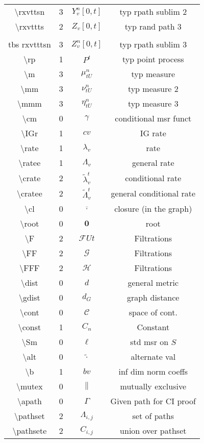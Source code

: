 \documentclass[12pt]{article}
\newcommand{\mc}{\mathcal}
\newcommand{\ov}{\overline}
\newcommand{\tbs}{\textbackslash}
\renewcommand{\root}{\mathbf{0}}				%
\renewcommand{\v}{v}							%
\renewcommand{\U}{U}							%
\renewcommand{\S}{S}							%
\renewcommand{\b}{b}							%
\renewcommand{\t}{t}							%
\newcommand{\F}{\mc{F}}							%
\newcommand{\FG}[2]{\mc{G}}						%
\newcommand{\FH}[2]{\mc{H}}						%
\newcommand{\IGr}{c}							%
\newcommand{\cl}{\ov}							%
\newcommand{\itt}{i}								%
\newcommand{\ittt}{j}								%
\newcommand{\numb}{n}								%
\newcommand{\rxvttsn}[3]{Y_{#1}^{#3}{#2}}			%
\newcommand{\rxvttts}[2]{Z_{#1}{#2}}				%
\newcommand{\rxvtttsn}[3]{Z_{#1}^{#3}{#2}}			%
\newcommand{\rp}[1]{P^{#1}}							%
\newcommand{\m}[3]{\mu_{#2#1}^{#3}}						%
\newcommand{\mm}[3]{\nu_{#2#1}^{#3}}						%
\newcommand{\mmm}[3]{\eta_{#2#1}^{#3}}						%
\newcommand{\cm}{\gamma}							%
\newcommand{\rate}[1]{\lambda_{#1}}					%
\newcommand{\ratee}[1]{\Lambda_{#1}}				%
\newcommand{\crate}[2]{\alt{\lambda}_{#1}^{#2}}		%
\newcommand{\cratee}[2]{\alt{\Lambda}_{#1}^{#2}} 	%
\newcommand{\dist}{d}								%
\newcommand{\gdist}{d_G}							%
\newcommand{\cont}{\mc{C}}							%
\newcommand{\const}[1]{C_{#1}}						%
\newcommand{\Sm}{\ell}								%
\newcommand{\alt}{\widetilde}						%
\newcommand{\mutex}{\|}								%
\newcommand{\apath}{\Gamma}						%
\newcommand{\pathset}[2]{\Lambda_{#1,#2}}			%
\newcommand{\pathsete}[2]{C_{#1,#2}}			%
\begin{document}
\begin{longtable}{c|c|c|c}
\tbs rxvttsn&3&\(\rxvttsn{\v}{[0,\t]}{\numb}\)	&typ rpath sublim 2\\
\tbs rxvttts&2&\(\rxvttts{\v}{[0,\t]}\)				&typ rand path 3\\\\tbs rxvtttsn&3&\(\rxvtttsn{\v}{[0,\t]}{\numb}\)	&typ rpath sublim 3\\
\tbs rp&1& \(\rp{\t}\)						&typ point process\\
\tbs m&3&\(\m{\U}{\t}{\numb}\)						&typ measure\\
\tbs mm&3&\(\mm{\U}{\t}{\numb}\)						&typ measure 2\\
\tbs mmm&3&\(\mmm{\U}{\t}{\numb}\)						&typ measure 3\\
\tbs cm&0&\(\cm\)							&conditional msr funct\\
\tbs IGr&1&\(\IGr{\v}\)						&IG rate\\
\tbs rate&1&\(\rate{\v}\)					&rate\\
\tbs ratee&1&\(\ratee{\v}\)					&general rate\\
\tbs crate&2&\(\crate{\v}{\t}\)		&conditional rate\\
\tbs cratee&2&\(\cratee{\v}{\t}\)		&general conditional rate\\
\tbs cl&0&\(\cl{\cdot}\)			&closure (in the graph)\\
\tbs root&0&\(\root\)				&root\\
\tbs F&2&\(\F{\U}{\t}\)&Filtrations\\
\tbs FF&2&\(\FG{\U}{\t}\)&Filtrations\\
\tbs FFF&2&\(\FH{\U}{\t}\)&Filtrations\\
\tbs dist&0& \(\dist\)				&general metric\\
\tbs gdist &0& \(\gdist\)			&graph distance\\
\tbs cont &0& \(\cont\)				&space of cont. \\
\tbs const &1& \(\const{\numb}\)	&Constant\\
\tbs Sm&0&\(\Sm\)							&std msr on \(\S\)\\
\tbs alt&0&\(\widetilde{\cdot}\)			&alternate val\\
\tbs b&1& \(\b{\v}\)						&inf dim norm coeffs\\
\tbs mutex&0&\(\mutex\)						&mutually exclusive\\
\tbs apath&0&\(\apath\)						&Given path for CI proof\\
\tbs pathset&2&\(\pathset{\itt}{\ittt}\)	&set of paths\\
\tbs pathsete&2&\(\pathsete{\itt}{\ittt}\)	&union over pathset\\

\end{longtable}
\end{document}
